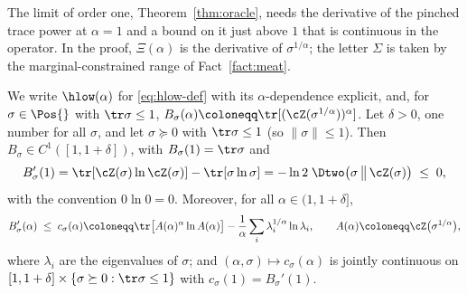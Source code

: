 
The limit of order one, Theorem~\ref{thm:oracle}, needs the derivative of
the pinched trace power at $\alpha=1$ and a bound on it just above $1$
that is continuous in the operator. In the proof, $\Xi(\alpha)$ is the
derivative of $\sigma^{1/\alpha}$; the letter $\Sigma$ is taken by the
marginal-constrained range of Fact~\ref{fact:meat}.

\begin{lemma}\label{lem:b-derivative}
We write $\hlow(\alpha)$ for \eqref{eq:hlow-def} with its
$\alpha$-dependence explicit, and, for $\sigma\in\Pos{}$ with
$\tr\sigma\le1$,
$B_{\sigma}(\alpha)\coloneqq\tr[(\cZ(\sigma^{1/\alpha}))^{\alpha}]$.
Let $\delta>0$, one number for all $\sigma$, and let $\sigma\succeq0$ with
$\tr\sigma\le1$ (so $\|\sigma\|\le1$). Then
$B_{\sigma}\in C^{1}([1,1+\delta])$, with
$B_{\sigma}(1)=\tr\sigma$ and
\begin{equation}\label{eq:Bprime}
  B_{\sigma}'(1)=\tr[\cZ(\sigma)\ln\cZ(\sigma)]-\tr[\sigma\ln\sigma]
  =-\ln2\;\Dtwo\big(\sigma\,\big\|\,\cZ(\sigma)\big)
  \;\le\;0,
\end{equation}
with the convention $0\ln0=0$. Moreover, for all
$\alpha\in(1,1+\delta]$,
\begin{equation}\label{eq:majorant}
  B_{\sigma}'(\alpha)\;\le\;c_{\sigma}(\alpha)\coloneqq
  \tr\big[A(\alpha)^{\alpha}\ln A(\alpha)\big]
  -\frac1{\alpha}\sum_i\lambda_i^{1/\alpha}\ln\lambda_i ,
  \qquad A(\alpha)\coloneqq\cZ\big(\sigma^{1/\alpha}\big),
\end{equation}
where $\lambda_i$ are the eigenvalues of $\sigma$; and
$(\alpha,\sigma)\mapsto c_{\sigma}(\alpha)$ is jointly continuous on
$[1,1+\delta]\times\{\sigma\succeq0:\tr\sigma\le1\}$ with
$c_{\sigma}(1)=B_{\sigma}'(1)$.
\end{lemma}

